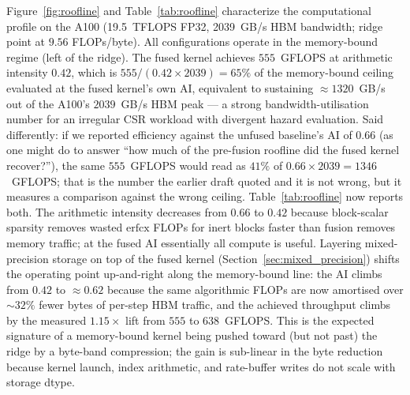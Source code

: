 \documentclass[a4paper,fleqn]{cas-sc}
\theoremstyle{definition}
\theoremstyle{remark}
\begin{document}
Figure~\ref{fig:roofline} and Table~\ref{tab:roofline} characterize the computational profile on the A100 (19.5~TFLOPS FP32, 2039~GB/s HBM bandwidth; ridge point at $9.56$ FLOPs/byte). All configurations operate in the memory-bound regime (left of the ridge). The fused kernel achieves $555$~GFLOPS at arithmetic intensity $0.42$, which is $555 / (0.42 \times 2039) = 65\%$ of the memory-bound ceiling evaluated at the fused kernel's own AI, equivalent to sustaining $\approx 1320$~GB/s out of the A100's $2039$~GB/s HBM peak --- a strong bandwidth-utilisation number for an irregular CSR workload with divergent hazard evaluation. Said differently: if we reported efficiency against the unfused baseline's AI of $0.66$ (as one might do to answer ``how much of the pre-fusion roofline did the fused kernel recover?''), the same $555$~GFLOPS would read as $41\%$ of $0.66 \times 2039 = 1346$~GFLOPS; that is the number the earlier draft quoted and it is not wrong, but it measures a comparison against the wrong ceiling. Table~\ref{tab:roofline} now reports both. The arithmetic intensity decreases from $0.66$ to $0.42$ because block-scalar sparsity removes wasted $\mathrm{erfcx}$ FLOPs for inert blocks faster than fusion removes memory traffic; at the fused AI essentially all compute is useful. Layering mixed-precision storage on top of the fused kernel (Section~\ref{sec:mixed_precision}) shifts the operating point up-and-right along the memory-bound line: the AI climbs from $0.42$ to $\approx 0.62$ because the same algorithmic FLOPs are now amortised over $\sim\!32\%$ fewer bytes of per-step HBM traffic, and the achieved throughput climbs by the measured $1.15\times$ lift from $555$ to $638$~GFLOPS. This is the expected signature of a memory-bound kernel being pushed toward (but not past) the ridge by a byte-band compression; the gain is sub-linear in the byte reduction because kernel launch, index arithmetic, and rate-buffer writes do not scale with storage dtype.
\end{document}
